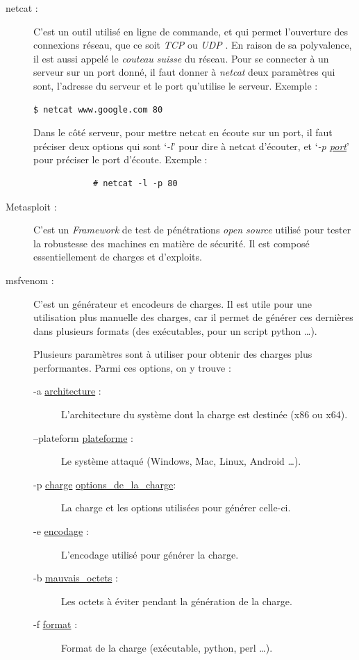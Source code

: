     \begin{description}
        \item[netcat :] \label{netcat}
            C'est un outil utilisé en ligne de commande, et qui permet l'ouverture des connexions
            réseau, que ce soit \emph{TCP} \cite{reseau} ou \emph{UDP} \cite{reseau}. En raison de sa polyvalence,
            il est aussi appelé le \emph{couteau suisse} du réseau.
            Pour se connecter à un serveur sur un port donné, il faut donner à \emph{netcat} deux paramètres qui sont, 
            l'adresse du serveur et le port qu'utilise le serveur. Exemple :
            \begin{lstlisting}[language=bash] 
            $ netcat www.google.com 80
            \end{lstlisting}

            Dans le côté serveur, pour mettre netcat en écoute sur un port, il faut préciser deux options qui sont 
            `\emph{-l}' pour dire à netcat d'écouter, et `\emph{-p \ul{port}}' pour préciser le port d'écoute.
            Exemple :
            \begin{lstlisting}
            # netcat -l -p 80   
            \end{lstlisting}

        \item[Metasploit :] C'est un \emph{Framework} de test de pénétrations \emph{open source} utilisé pour 
            tester la robustesse des machines en matière de sécurité. Il est composé essentiellement de charges 
            et d'exploits. 

        \item[msfvenom :] \label{msfvenom} C'est un générateur et encodeurs de charges. Il est utile pour une 
            utilisation plus manuelle des charges, car il permet de générer ces dernières dans plusieurs formats 
            (des exécutables, pour un script python \ldots{}). 

            Plusieurs paramètres sont à utiliser pour obtenir des charges plus performantes. Parmi ces options, on y
            trouve :
            \begin{description}
                \item[-a \ul{architecture} :] L'architecture du système dont la charge est destinée
                    (x86 ou x64).
                \item[--plateform \ul{plateforme} :] Le système attaqué (Windows, Mac, Linux, Android
                \ldots{}).
                \item[-p \ul{charge} \ul{options\_de\_la\_charge}:] La charge et les options utilisées 
                    pour générer celle-ci.
                \item[-e \ul{encodage} :] L'encodage utilisé pour générer la charge.
                \item[-b \ul{mauvais\_octets} :] Les octets à éviter pendant la génération de la charge.
                \item[-f \ul{format} :] Format de la charge (exécutable, python, perl \ldots{}).
            \end{description}


\end{description}
